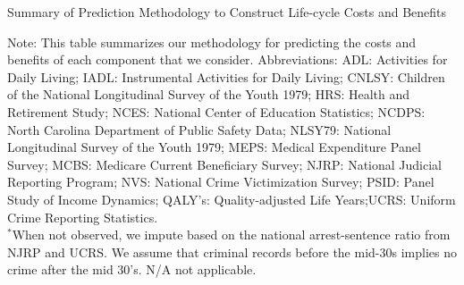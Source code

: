 \begin{table}
\begin{threeparttable}
\caption{Summary of Prediction Methodology to Construct Life-cycle Costs and Benefits} \label{table:sources}
\tiny

\begin{tablenotes}
\scriptsize
Note: This table summarizes our methodology for predicting the costs and benefits of each component that we consider. Abbreviations: ADL: Activities for Daily Living; IADL: Instrumental Activities for Daily Living; CNLSY: Children of the National Longitudinal Survey of the Youth 1979;  HRS: Health and Retirement Study; NCES: National Center of Education Statistics; NCDPS: North Carolina Department of Public Safety Data; NLSY79: National Longitudinal Survey of the Youth 1979; MEPS: Medical Expenditure Panel Survey; MCBS: Medicare Current Beneficiary Survey; NJRP: National Judicial Reporting Program; NVS: National Crime Victimization Survey; PSID: Panel Study of Income Dynamics; QALY's: Quality-adjusted Life Years;UCRS: Uniform Crime Reporting Statistics.\\
$^*$When not observed, we impute based on the national arrest-sentence ratio  from NJRP and UCRS. We assume that criminal records before the mid-30s implies no crime after the mid 30's. N/A not applicable.
\end{tablenotes}
\end{threeparttable}
\end{table}

